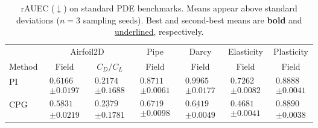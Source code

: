 \begin{table}[!htbp]
    \centering
    \small
    \caption{rAUEC ($\downarrow$) on standard PDE benchmarks.  Means appear above standard deviations ($n=3$ sampling seeds). Best and second-best means are \textbf{bold} and \underline{underlined}, respectively.}
    \label{tab:standard_benchmarks}
    \setlength{\tabcolsep}{3pt}
    \renewcommand{\arraystretch}{1.12}
    \begin{tabular*}{\textwidth}{@{\extracolsep{\fill}}lcccccc@{}}
        \toprule
        & \multicolumn{2}{c}{Airfoil2D} & Pipe & Darcy & Elasticity & Plasticity \\
        \cmidrule(lr){2-3}
        Method & Field & $C_D/C_L$ & Field & Field & Field & Field \\
        \midrule
        PI & $\begin{gathered}0.6166\\[-2pt]\pm 0.0197\end{gathered}$ & $\begin{gathered}\mathbf{0.2174}\\[-2pt]\pm 0.1688\end{gathered}$ & $\begin{gathered}0.8711\\[-2pt]\pm 0.0061\end{gathered}$ & $\begin{gathered}0.9965\\[-2pt]\pm 0.0177\end{gathered}$ & $\begin{gathered}0.7262\\[-2pt]\pm 0.0082\end{gathered}$ & $\begin{gathered}\mathbf{0.8888}\\[-2pt]\pm 0.0041\end{gathered}$ \\
        \addlinespace[3pt]
        CPG & $\begin{gathered}\underline{0.5831}\\[-2pt]\pm 0.0219\end{gathered}$ & $\begin{gathered}\underline{0.2379}\\[-2pt]\pm 0.1781\end{gathered}$ & $\begin{gathered}\mathbf{0.6719}\\[-2pt]\pm 0.0098\end{gathered}$ & $\begin{gathered}\underline{0.6419}\\[-2pt]\pm 0.0049\end{gathered}$ & $\begin{gathered}\mathbf{0.4681}\\[-2pt]\pm 0.0041\end{gathered}$ & $\begin{gathered}\underline{0.8890}\\[-2pt]\pm 0.0038\end{gathered}$ \\

\end{tabular*}
\end{table}
